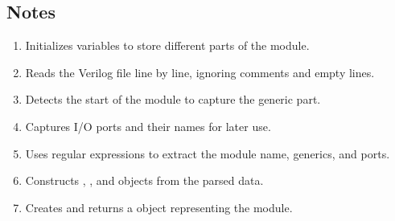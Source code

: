 \documentclass[letterpaper,10pt,english]{sphinxmanual}
\begin{document}
\begin{fulllineitems}
\begin{description}
\end{description}


\subsection{Notes}
\label{\detokenize{my_parser:id3}}\begin{description}
\begin{enumerate}
%
\item {} 
\sphinxAtStartPar
Initializes variables to store different parts of the module.

\item {} 
\sphinxAtStartPar
Reads the Verilog file line by line, ignoring comments and empty lines.

\item {} 
\sphinxAtStartPar
Detects the start of the module to capture the generic part.

\item {} 
\sphinxAtStartPar
Captures I/O ports and their names for later use.

\item {} 
\sphinxAtStartPar
Uses regular expressions to extract the module name, generics, and ports.

\item {} 
\sphinxAtStartPar
Constructs , , and  objects from the parsed data.

\item {} 
\sphinxAtStartPar
Creates and returns a  object representing the module.

\end{enumerate}

\end{description}

\end{fulllineitems}

\end{document}
